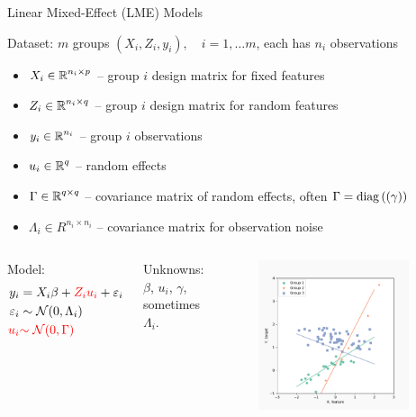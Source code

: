 \documentclass[8pt]{beamer}
\begin{document}
\begin{frame}{Linear Mixed-Effect (LME) Models}

	Dataset: $m$ groups $(X_i, Z_i, y_i),\quad i = 1, \dots m$, each has $n_i$ observations
	\begin{itemize}
		\item 	$X_i \in \operatorname{\mathbb{R}}^{n_i \times p}$ -- group $i$ design matrix for fixed features
		\item 	$Z_i \in \operatorname{\mathbb{R}}^{n_i \times q}$ -- group $i$ design matrix for random features
		\item 	$y_i \in \operatorname{\mathbb{R}}^{n_i}$ -- group $i$ observations  
		\item   $u_i \in \operatorname{\mathbb{R}}^q$ -- random effects
		\item   $\Gamma \in \operatorname{\mathbb{R}}^{q \times q}$ -- covariance matrix of random effects, often $\Gamma = \mathrm{diag}\left((\gamma)\right)$
		\item   $\Lambda_i \in R^{n_i \times n_i}$ -- covariance matrix for observation noise
	\end{itemize}
	

	\begin{columns}[T,onlytextwidth]
	
    \vspace{3em}
    Model:
	 	\[
   		\begin{split}
   			y_i & = X_i\beta + {\color{red}Z_i u_i} + \varepsilon_i \\
   			 \varepsilon_i & \sim \operatorname{\mathcal{N}}(0, \Lambda_i) \\
   			{\color{red} u_i} & {\color{red}\sim \operatorname{\mathcal{N}}(0, \Gamma)}
   		\end{split}
   		\]
   		   	
	Unknowns: $\beta$, $u_i$, $\gamma$, sometimes $\Lambda_i$.
	
    	\centering  
   	\begin{figure}
   		\includegraphics[width=0.9\textwidth]{Figures/lme_example_random_prediction}
   	\end{figure}
   	   		


\end{columns}
\end{frame}
\end{document}
